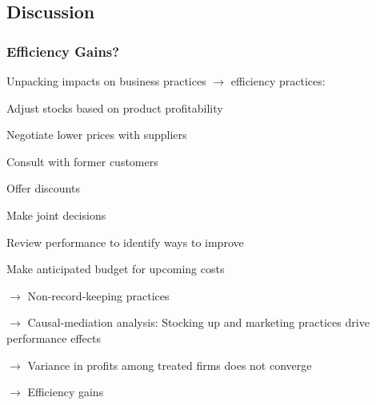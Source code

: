 \documentclass[hideothersubsections, usenames,dvipsnames,11pt]{beamer}
\newenvironment{itemize_3pt}{\itemize\addtolength{\itemsep}{3pt}}{\enditemize}
\begin{document}
\subsection{Discussion}
\begin{frame}
\frametitle{Efficiency Gains?}
Unpacking impacts on business practices $\rightarrow$ \textcolor{bdf}{efficiency practices}:
\vspace{0.1in}
\begin{itemize_3pt}
	\item Adjust stocks based on product profitability
	\item Negotiate lower prices with suppliers
	\item Consult with former customers
	\item Offer discounts
	\item Make joint decisions
	\item Review performance to identify ways to improve
	\item Make anticipated budget for upcoming costs
	\vspace{0.1in}

	\pause
	
	\item[] $\rightarrow$ \textcolor{bdf}{Non-record-keeping practices}
	\vspace{0.1in}
	
	\pause
	
	\item[] $\rightarrow$ Causal-mediation analysis: \textcolor{bdf}{Stocking up and marketing practices} drive performance effects
	
	\pause
	
	\item[] $\rightarrow$ Variance in profits among treated firms does not converge
	
	\item[] $\rightarrow$ \textcolor{bdf}{Efficiency gains}
\end{itemize_3pt}
\end{frame}
\end{document}
